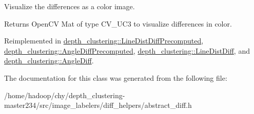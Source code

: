Visualize the differences as a color image. 

\begin{DoxyReturn}{Returns}
Open\-C\-V Mat of type C\-V\-\_\-U\-C3 to visualize differences in color. 
\end{DoxyReturn}


Reimplemented in \hyperlink{classdepth__clustering_1_1LineDistDiffPrecomputed_ae06f8b4dd6330730849725c1b1f20b43}{depth\-\_\-clustering\-::\-Line\-Dist\-Diff\-Precomputed}, \hyperlink{classdepth__clustering_1_1AngleDiffPrecomputed_a35da8cd9455b3485acfd5da203ecaafb}{depth\-\_\-clustering\-::\-Angle\-Diff\-Precomputed}, \hyperlink{classdepth__clustering_1_1LineDistDiff_a7feaf820589ccfb47786d5124a74d725}{depth\-\_\-clustering\-::\-Line\-Dist\-Diff}, and \hyperlink{classdepth__clustering_1_1AngleDiff_a462e4aadd35ca06e9b061d08c9787074}{depth\-\_\-clustering\-::\-Angle\-Diff}.



The documentation for this class was generated from the following file\-:\begin{DoxyCompactItemize}
\item 
/home/hadoop/chy/depth\-\_\-clustering-\/master234/src/image\-\_\-labelers/diff\-\_\-helpers/abstract\-\_\-diff.\-h\end{DoxyCompactItemize}
